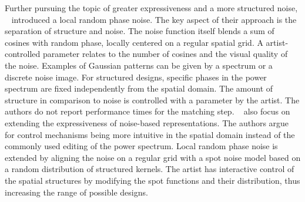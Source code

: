 Further pursuing the topic of greater expressiveness and a more structured noise, \citeauthor*{gilet_2014_lrn}~\cite{gilet_2014_lrn} introduced a local random phase noise. The key aspect of their approach is the separation of structure and noise. The noise function itself blends a sum of cosines with random phase, locally centered on a regular spatial grid. A artist-controlled parameter relates to the number of cosines and the visual quality of the noise. Examples of Gaussian patterns can be given by a spectrum or a discrete noise image. For structured designs, specific phases in the power spectrum are fixed independently from the spatial domain. The amount of structure in comparison to noise is controlled with a parameter by the artist. The authors do not report performance times for  the matching step.  \citeauthor*{pavie_2016_pts}~\cite{pavie_2016_pts} also focus on extending the expressiveness of noise-based representations. The authors argue for control mechanisms being more intuitive in the spatial domain instead of the commonly used editing of the power spectrum. Local random phase noise \cite{gilet_2014_lrn} is extended by aligning the noise on a regular grid with a spot noise model based on a random distribution of structured kernels. The artist has interactive control of the spatial structures by modifying the spot functions and their distribution, thus increasing the range of possible designs.

